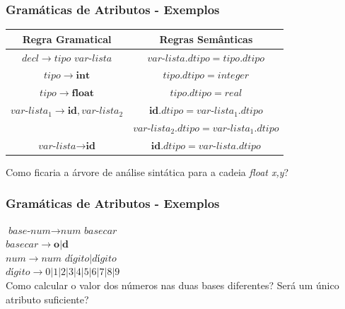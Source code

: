 \documentclass[table]{beamer}
\begin{document}
\begin{frame}
   \frametitle{Gramáticas de Atributos - Exemplos}
   \begin{table}
      \begin{tabular}{cc}
      Regra Gramatical & Regras Semânticas \\
      \hline 
      $decl\to \textit{tipo var-lista}$                              & $\textit{var-lista}.dtipo = tipo.dtipo$            \\
      $tipo\to \textbf{int}$                                         & $tipo.dtipo = integer$                             \\
      $tipo\to \textbf{float}$                                       & $tipo.dtipo = real$                                \\
      $\textit{var-lista}_{1}\to\textbf{id},\textit{var-lista}_{2}$  & $\textbf{id}.dtipo = \textit{var-lista}_{1}.dtipo$ \\
                                                                     & $\textit{var-lista}_{2}.dtipo = \textit{var-lista}_{1}.dtipo$ \\
      $\textit{var-lista}\to\textbf{id}$                             & $\textbf{id}.dtipo = \textit{var-lista}.dtipo$ \\
      \hline
      \end{tabular}
   \end{table}
   Como ficaria a árvore de análise sintática para a cadeia \textit{float x,y}?
\end{frame}

\begin{frame}
   \frametitle{Gramáticas de Atributos - Exemplos}
   $\textit{base-num}\to\textit{num basecar}$ \\
   $basecar\to\textbf{o}|\textbf{d}$ \\
   $num\to\textit{num dígito}|\textit{dígito}$ \\ 
   $\textit{dígito}\to0|1|2|3|4|5|6|7|8|9$ \\
   Como calcular o valor dos números nas duas bases diferentes? Será um único atributo suficiente?
\end{frame}
\end{document}
